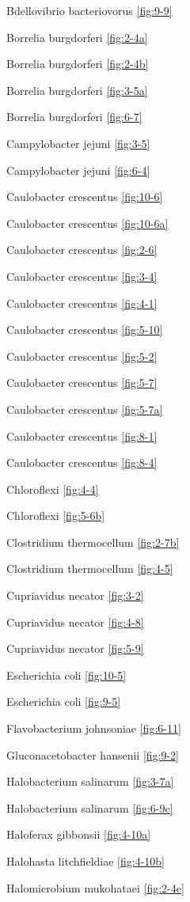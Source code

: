 \documentclass[]{tufte-book}
\begin{document}
Bdellovibrio bacteriovorus \ref{fig:9-9}

Borrelia burgdorferi \ref{fig:2-4a}

Borrelia burgdorferi \ref{fig:2-4b}

Borrelia burgdorferi \ref{fig:3-5a}

Borrelia burgdorferi \ref{fig:6-7}

Campylobacter jejuni \ref{fig:3-5}

Campylobacter jejuni \ref{fig:6-4}

Caulobacter crescentus \ref{fig:10-6}

Caulobacter crescentus \ref{fig:10-6a}

Caulobacter crescentus \ref{fig:2-6}

Caulobacter crescentus \ref{fig:3-4}

Caulobacter crescentus \ref{fig:4-1}

Caulobacter crescentus \ref{fig:5-10}

Caulobacter crescentus \ref{fig:5-2}

Caulobacter crescentus \ref{fig:5-7}

Caulobacter crescentus \ref{fig:5-7a}

Caulobacter crescentus \ref{fig:8-1}

Caulobacter crescentus \ref{fig:8-4}

Chloroflexi \ref{fig:4-4}

Chloroflexi \ref{fig:5-6b}

Clostridium thermocellum \ref{fig:2-7b}

Clostridium thermocellum \ref{fig:4-5}

Cupriavidus necator \ref{fig:3-2}

Cupriavidus necator \ref{fig:4-8}

Cupriavidus necator \ref{fig:5-9}

Escherichia coli \ref{fig:10-5}

Escherichia coli \ref{fig:9-5}

Flavobacterium johnsoniae \ref{fig:6-11}

Gluconacetobacter hansenii \ref{fig:9-2}

Halobacterium salinarum \ref{fig:3-7a}

Halobacterium salinarum \ref{fig:6-9c}

Haloferax gibbonsii \ref{fig:4-10a}

Halohasta litchfieldiae \ref{fig:4-10b}

Halomicrobium mukohataei \ref{fig:2-4e}
\end{document}
